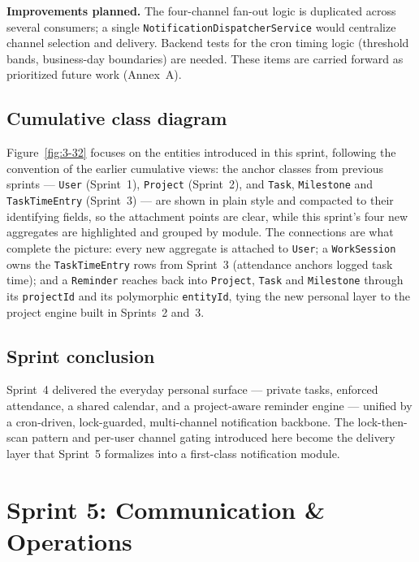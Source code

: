 \textbf{Improvements planned.} The four-channel fan-out logic is duplicated across several
consumers; a single \texttt{NotificationDispatcherService} would centralize channel selection
and delivery. Backend tests for the cron timing logic (threshold bands, business-day
boundaries) are needed. These items are carried forward as prioritized future work (Annex~A).

\subsection{Cumulative class diagram}

Figure~\ref{fig:3-32} focuses on the entities introduced in this sprint, following the
convention of the earlier cumulative views: the anchor classes from previous sprints ---
\texttt{User} (Sprint~1), \texttt{Project} (Sprint~2), and \texttt{Task}, \texttt{Milestone} and
\texttt{TaskTimeEntry} (Sprint~3) --- are shown in plain style and compacted to their
identifying fields, so the attachment points are clear, while this sprint's four new
aggregates are highlighted and grouped by module. The
connections are what complete the picture: every new aggregate is attached to \texttt{User}; a
\texttt{WorkSession} owns the \texttt{TaskTimeEntry} rows from Sprint~3 (attendance
anchors logged task time); and a \texttt{Reminder} reaches back into \texttt{Project},
\texttt{Task} and \texttt{Milestone} through its \texttt{projectId} and its polymorphic
\texttt{entityId}, tying the new personal layer to the project engine built in Sprints~2 and~3.


\subsection{Sprint conclusion}

Sprint~4 delivered the everyday personal surface --- private tasks, enforced attendance, a
shared calendar, and a project-aware reminder engine --- unified by a cron-driven, lock-guarded,
multi-channel notification backbone. The lock-then-scan pattern and per-user channel gating
introduced here become the delivery layer that Sprint~5 formalizes into a first-class
notification module.

\clearpage
\section{Sprint 5: Communication \& Operations}

